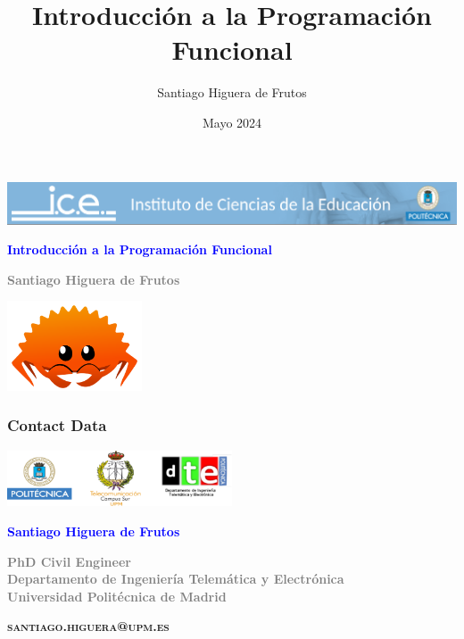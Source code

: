 \documentclass[aspectratio = 169, 12pt]{beamer}
\title{Introducción a la Programación Funcional}
\author{Santiago Higuera de Frutos}
\institute{Universidad Politécnica de Madrid}
\date{Mayo 2024}
\begin{document}
\begin{frame}
   \begin{center}
      \includegraphics[width=\textwidth]{img/banner_ice.png}
   \end{center}
   {\centering\Large\textbf{\textcolor{blue}{Introducción a la Programación Funcional}} \par}
   \vspace{2em}
   {\centering\textbf{\textcolor{gray}{Santiago Higuera de Frutos}} \par}
   \vfill
   {\centering\includegraphics[width=4cm]{img/Rustacean-orig-noshadow.png} \par}
\end{frame}
	

\begin{frame}
	\frametitle{Contact Data}
	\begin{center}
      \begin{center}
         \includegraphics[width=0.5\textwidth]{img/logos.png}
      \end{center}
      \vspace{2em}
		{\Large\textbf{\textcolor{blue}{Santiago Higuera de Frutos}}}

		\vspace{0.5em}
		{\centering\textcolor{gray}{\textbf{PhD Civil Engineer \\	Departamento de Ingeniería Telemática y Electrónica \\Universidad Politécnica de Madrid}}\par}

		\vspace{1.5em}
	   {\centering \textbf{\textsc{santiago.higuera@upm.es}}\par}
	\end{center}
\end{frame}
\end{document}
